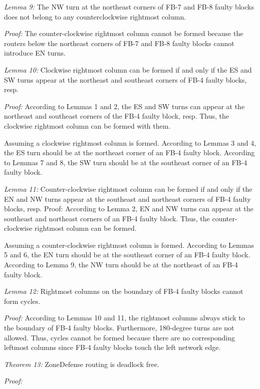 \textit{Lemma 9:} The NW turn at the northeast corners of FB-7 and FB-8 faulty blocks does not belong to any counterclockwise rightmost column.

\textit{Proof:} The counter-clockwise rightmost column cannot be formed because the routers below the northeast corners of FB-7 and FB-8 faulty blocks cannot introduce EN turns. 

\textit{Lemma 10:} Clockwise rightmost column can be formed if and only if the ES and SW turns appear at the northeast and southeast corners of FB-4 faulty blocks, resp.

\textit{Proof:} According to Lemmas 1 and 2, the ES and SW turns can appear at the northeast and southeast corners of the FB-4 faulty block, resp. Thus, the clockwise rightmost column can be formed with them.

Assuming a clockwise rightmost column is formed. According to Lemmas 3 and 4, the ES turn should be at the northeast corner of an FB-4 faulty block. According to Lemmas 7 and 8, the SW turn should be at the southeast corner of an FB-4 faulty block.

\textit{Lemma 11:} Counter-clockwise rightmost column can be formed if and only if the EN and NW turns appear at the southeast and northeast corners of FB-4 faulty blocks, resp. Proof: According to Lemma 2, EN and NW turns can appear at the southeast and northeast corners of an FB-4 faulty block. Thus, the counter-clockwise rightmost column can be formed.

Assuming a counter-clockwise rightmost column is formed. According to Lemmas 5 and 6, the EN turn should be at the southeast corner of an FB-4 faulty block. According to Lemma 9, the NW turn should be at the northeast of an FB-4 faulty block.

\textit{Lemma 12:} Rightmost columns on the boundary of FB-4 faulty blocks cannot form cycles.

\textit{Proof:} According to Lemmas 10 and 11, the rightmost columns always stick to the boundary of FB-4 faulty blocks. Furthermore, 180-degree turns are not allowed. Thus, cycles cannot be formed because there are no corresponding leftmost columns since FB-4 faulty blocks touch the left network edge.

\textit{Theorem 13:} ZoneDefense routing is deadlock free. 

\textit{Proof:}

